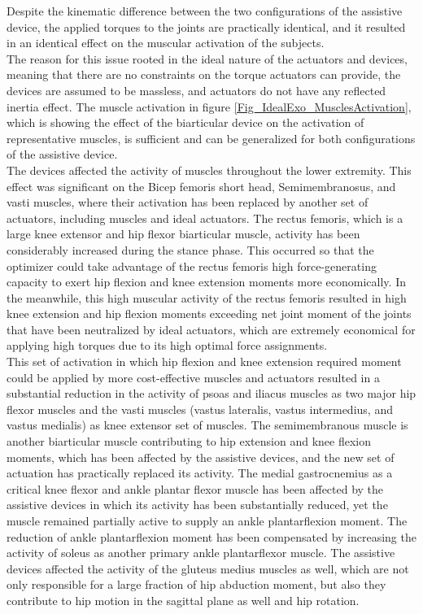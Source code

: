 \documentclass[10pt,letterpaper]{article}
\begin{document}
Despite the kinematic difference between the two configurations of the assistive device, the applied torques to the joints are practically identical, and it resulted in an identical effect on the muscular activation of the subjects.\\
The reason for this issue rooted in the ideal nature of the actuators and devices, meaning that there are no constraints on the torque actuators can provide, the devices are assumed to be massless, and actuators do not have any reflected inertia effect. The muscle activation in figure \ref{Fig_IdealExo_MusclesActivation}, which is showing the effect of the biarticular device on the activation of representative muscles, is sufficient and can be generalized for both configurations of the assistive device. \\
The devices affected the activity of muscles throughout the lower extremity. This effect was significant on the Bicep femoris short head, Semimembranosus, and vasti muscles, where their activation has been replaced by another set of actuators, including muscles and ideal actuators.  The rectus femoris, which is a large knee extensor and hip flexor biarticular muscle,  activity has been considerably increased during the stance phase. This occurred so that the optimizer could take advantage of the rectus femoris high force-generating capacity to exert hip flexion and knee extension moments more economically. In the meanwhile, this high muscular activity of the rectus femoris resulted in high knee extension and hip flexion moments exceeding net joint moment of the joints that have been neutralized by ideal actuators, which are extremely economical for applying high torques due to its high optimal force assignments.\\
This set of activation in which hip flexion and knee extension required moment could be applied by more cost-effective muscles and actuators resulted in a substantial reduction in the activity of psoas and iliacus muscles as two major hip flexor muscles and the vasti muscles (vastus lateralis, vastus intermedius, and vastus medialis) as knee extensor set of muscles. The semimembranous muscle is another biarticular muscle contributing to hip extension and knee flexion moments, which has been affected by the assistive devices, and the new set of actuation has practically replaced its activity. The medial gastrocnemius as a critical knee flexor and ankle plantar flexor muscle has been affected by the assistive devices in which its activity has been substantially reduced, yet the muscle remained partially active to supply an ankle plantarflexion moment. The reduction of ankle plantarflexion moment has been compensated by increasing the activity of soleus as another primary ankle plantarflexor muscle. The assistive devices affected the activity of the gluteus medius muscles as well, which are not only responsible for a large fraction of hip abduction moment, but also they contribute to hip motion in the sagittal plane as well and hip rotation.\\
\end{document}
